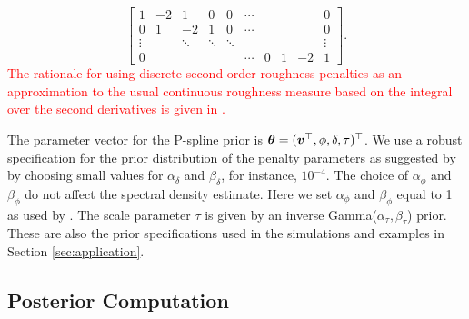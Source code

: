 \documentclass[twocolumn,final]{svjour3}
\newcommand{\bm}[1]{\mbox{\boldmath $#1$}}
\begin{document}
\begin{equation}\label{eq:D2}
\begin{bmatrix}
1 & -2 &  1 & 0 & 0 & \cdots & & & & 0 \\
0 & 1  & -2 & 1 & 0 & \cdots & & & & 0 \\
\vdots & & \ddots & \ddots & \ddots &&&&& \vdots \\
0 & &&&& \cdots & 0 & 1 & -2 & 1 
\end{bmatrix}.
\end{equation}
\textcolor{red}{The rationale for using discrete second order roughness penalties as an approximation to the usual continuous roughness measure based on the integral over the second derivatives is given
in \cite{Eilers:1996}.}

The parameter vector for the P-spline prior is $\bm{\theta} = (\bm{v}^\top, \phi, \delta, \tau)^\top$.
We use a robust specification for the  prior distribution of the penalty parameters as suggested by \cite{Jullion:2007} by choosing small values for $\alpha_{\delta}$ and $\beta_{\delta}$, for instance, $10^{-4}$. The  choice of $\alpha_{\phi}$ and $\beta_{\phi}$ do not affect the spectral density estimate. Here we set $\alpha_{\phi}$ and $\beta_{\phi}$ equal to 1 as used by \cite{Bremhorst:2016}. The scale parameter $\tau$ is given by an inverse Gamma($\alpha_{\tau},\beta_{\tau}$) prior.  These are also the prior specifications used in the simulations and examples in Section \ref{sec:application}.




\subsection*{Posterior Computation}
\end{document}
